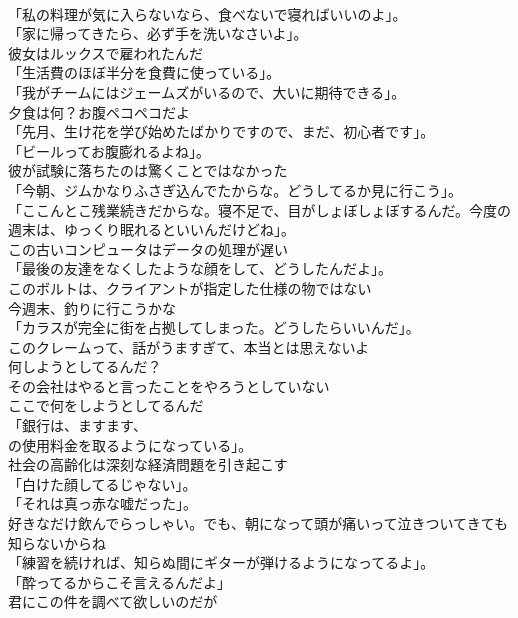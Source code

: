 \documentclass[8pt]{extreport}
\begin{document}
\begin{CJK}{UTF8}{min}
\\	「私の料理が気に入らないなら、食べないで寝ればいいのよ」。	
\\	「家に帰ってきたら、必ず手を洗いなさいよ」。	
\\	彼女はルックスで雇われたんだ	
\\	「生活費のほぼ半分を食費に使っている」。	
\\	「我がチームにはジェームズがいるので、大いに期待できる」。	
\\	夕食は何？お腹ペコペコだよ	
\\	「先月、生け花を学び始めたばかりですので、まだ、初心者です」。	
\\	「ビールってお腹膨れるよね」。	
\\	彼が試験に落ちたのは驚くことではなかった	
\\	「今朝、ジムかなりふさぎ込んでたからな。どうしてるか見に行こう」。	
\\	「ここんとこ残業続きだからな。寝不足で、目がしょぼしょぼするんだ。今度の週末は、ゆっくり眠れるといいんだけどね」。	
\\	この古いコンピュータはデータの処理が遅い	
\\	「最後の友達をなくしたような顔をして、どうしたんだよ」。	
\\	このボルトは、クライアントが指定した仕様の物ではない	
\\	今週末、釣りに行こうかな	
\\	「カラスが完全に街を占拠してしまった。どうしたらいいんだ」。	
\\	このクレームって、話がうますぎて、本当とは思えないよ	
\\	何しようとしてるんだ？	
\\	その会社はやると言ったことをやろうとしていない	
\\	ここで何をしようとしてるんだ	
\\	「銀行は、ますます、
\\	の使用料金を取るようになっている」。	
\\	社会の高齢化は深刻な経済問題を引き起こす	
\\	「白けた顔してるじゃない」。	
\\	「それは真っ赤な嘘だった」。	
\\	好きなだけ飲んでらっしゃい。でも、朝になって頭が痛いって泣きついてきても知らないからね	
\\	「練習を続ければ、知らぬ間にギターが弾けるようになってるよ」。	
\\	「酔ってるからこそ言えるんだよ」	
\\	君にこの件を調べて欲しいのだが	

\end{CJK}
\end{document}
